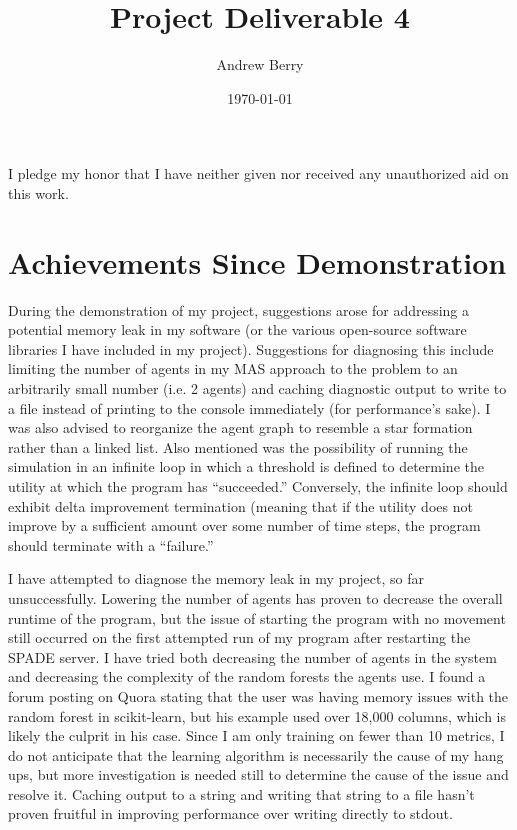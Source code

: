 \documentclass{article}
\title{Project Deliverable 4}
\author{Andrew Berry}
\date{\today}
\begin{document}
\maketitle

I pledge my honor that I have neither given nor received any unauthorized aid on this work.
\section{Achievements Since Demonstration}
\par
During the demonstration of my project, suggestions arose for addressing a potential memory leak in my software (or the various open-source software libraries I have included in my project). Suggestions for diagnosing this include limiting the number of agents in my MAS approach to the problem to an arbitrarily small number (i.e. 2 agents) and caching diagnostic output to write to a file instead of printing to the console immediately (for performance's sake). I was also advised to reorganize the agent graph to resemble a star formation rather than a linked list. Also mentioned was the possibility of running the simulation in an infinite loop in which a threshold is defined to determine the utility at which the program has ``succeeded.'' Conversely, the infinite loop should exhibit delta improvement termination (meaning that if the utility does not improve by a sufficient amount over some number of time steps, the program should terminate with a ``failure.''
\par
I have attempted to diagnose the memory leak in my project, so far unsuccessfully. Lowering the number of agents has proven to decrease the overall runtime of the program, but the issue of starting the program with no movement still occurred on the first attempted run of my program after restarting the SPADE server. I have tried both decreasing the number of agents in the system and decreasing the complexity of the random forests the agents use. I found a forum posting on Quora stating that the user was having memory issues with the random forest in scikit-learn, but his example used over 18,000 columns, which is likely the culprit in his case. Since I am only training on fewer than 10 metrics, I do not anticipate that the learning algorithm is necessarily the cause of my hang ups, but more investigation is needed still to determine the cause of the issue and resolve it. Caching output to a string and writing that string to a file hasn't proven fruitful in improving performance over writing directly to stdout.
\par
\end{document}
